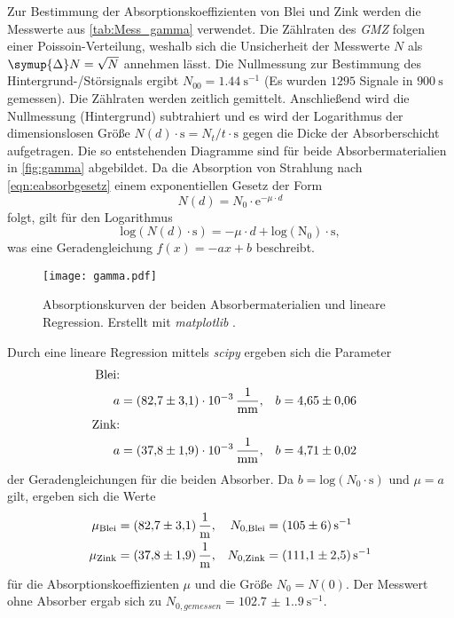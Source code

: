 Zur Bestimmung der Absorptionskoeffizienten von Blei und Zink werden die Messwerte aus \autoref{tab:Mess_gamma} verwendet. Die Zählraten des \textit{GMZ} folgen einer
Poissoin-Verteilung, weshalb sich die Unsicherheit der Messwerte $N$ als $\symup{\Delta}N = \sqrt{N}$ annehmen lässt. 
Die Nullmessung zur Bestimmung des Hintergrund-/Störsignals ergibt $N_{00} = \qty{1.44}{\second^{-1}}$ (Es wurden $1295$ Signale in $\qty{900}{\second}$ gemessen). 
Die Zählraten werden zeitlich gemittelt. Anschließend wird die Nullmessung (Hintergrund) subtrahiert und es 
wird der Logarithmus der dimensionslosen Größe $N(d) \cdot  \mathrm{s} = N_t/t \cdot  \mathrm{s}$ gegen die Dicke der Absorberschicht aufgetragen. 
Die so entstehenden Diagramme sind für beide Absorbermaterialien in 
\autoref{fig:gamma} abgebildet. 
Da die Absorption von Strahlung nach \autoref{eqn:eabsorbgesetz} einem exponentiellen Gesetz der Form 
\begin{equation}
  \label{eqn:Absorption}
  N(d) = N_0 \cdot \mathrm{e}^{-\mu \cdot d}
\end{equation}
folgt, gilt für den Logarithmus
\begin{equation*}
  \mathrm{log}(N(d)\cdot\mathrm{s}) = -\mu \cdot d + \mathrm{log(N_0) \cdot  \mathrm{s}},
\end{equation*}
was eine Geradengleichung $f(x) = -ax + b$ beschreibt. 

\begin{figure}
  \centering
  \texttt{[image: gamma.pdf]}
  \caption{Absorptionskurven der beiden Absorbermaterialien und lineare Regression. Erstellt mit \textit{matplotlib} \cite{matplotlib}.}
  \label{fig:gamma}
\end{figure}

Durch eine lineare Regression mittels \textit{scipy} \cite{scipy} ergeben sich die Parameter
\begin{align*}
    \text{Blei:} \\
    a &= \qty{82.7(3.1)e-3}{\per\milli\metre}, & b &= \num{4.65+-0.06} \\
    \text{Zink:} \\
    a &= \qty{37.8(1.9)e-3}{\per\milli\metre}, & b &= \num{4.71+-0.02} \\
\end{align*}
der Geradengleichungen für die beiden Absorber. Da $b = \mathrm{log}(N_0 \cdot  \mathrm{s})$ und $\mu = a$ gilt, ergeben sich die Werte
\begin{align*}
  \mu_\text{Blei} &= \qty{82.7(3.1)}{\per\metre}, & N_{0 \text{,Blei}} &= \qty{105+-6}{\second^{-1}} \\
  \mu_\text{Zink} &= \qty{37.8(1.9)}{\per\metre}, &  N_{0 \text{,Zink}} &= \qty{111.1+-2.5}{\second^{-1}} \\
\end{align*}
für die Absorptionskoeffizienten $\mu$ und die Größe $N_0 = N(0)$. Der Messwert ohne Absorber ergab sich zu $N_{0, gemessen} = \qty{102.7(1.9)}{\second^{-1}}$.

